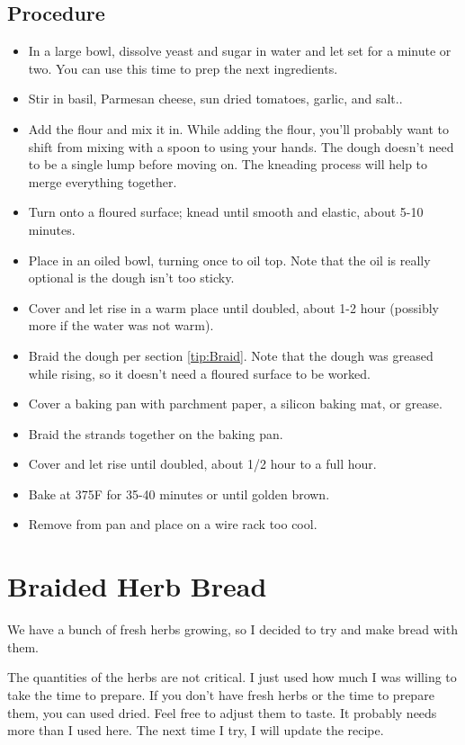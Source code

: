\documentclass[10pt, openany]{book}
\begin{document}
\subsection{Procedure}
\begin{itemize}
  \item In a large bowl, dissolve yeast and sugar in water and let set for a minute or two.  You can use this time to prep the next ingredients.
  \item Stir in basil, Parmesan cheese, sun dried tomatoes, garlic, and salt..
  \item Add the flour and mix it in.  While adding the flour, you'll probably want to shift from mixing with a spoon to using your hands.  The dough doesn't need to be a single lump before moving on.  The kneading process will help to merge everything together.
  \item Turn onto a floured surface; knead until smooth and elastic, about 5-10 minutes.
  \item Place in an oiled bowl, turning once to oil top.  Note that the oil is really optional is the dough isn't too sticky.
  \item Cover and let rise in a warm place until doubled, about 1-2 hour (possibly more if the water was not warm).
  \item Braid the dough per section \ref{tip:Braid}.  Note that the dough was greased while rising, so it doesn't need a floured surface to be worked.
  \item Cover a baking pan with parchment paper, a silicon baking mat, or grease.
  \item Braid the strands together on the baking pan.
  \item Cover and let rise until doubled, about 1/2 hour to a full hour.
  \item Bake at 375\degree{}F for 35-40 minutes or until golden brown.
  \item Remove from pan and place on a wire rack too cool.
\end{itemize}

\section{Braided Herb Bread}
\label{bread:Herb}
We have a bunch of fresh herbs growing, so I decided to try and make bread with them.

The quantities of the herbs are not critical.  I just used how much I was willing to take the time to prepare.  If you don't have fresh herbs or the time to prepare them, you can used dried.  Feel free to adjust them to taste.  It probably needs more than I used here.  The next time I try, I will update the recipe.
\end{document}
